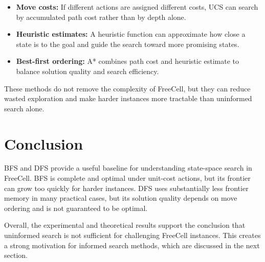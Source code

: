 \documentclass{article}
\begin{document}
\begin{itemize}
\item \textbf{Move costs:} If different actions are assigned different costs, UCS can search by accumulated path cost rather than by depth alone.
\item \textbf{Heuristic estimates:} A heuristic function can approximate how close a state is to the goal and guide the search toward more promising states.
\item \textbf{Best-first ordering:} A* combines path cost and heuristic estimate to balance solution quality and search efficiency.
\end{itemize}

These methods do not remove the complexity of FreeCell, but they can reduce wasted exploration and make harder instances more tractable than uninformed search alone.

\section{Conclusion}

BFS and DFS provide a useful baseline for understanding state-space search in FreeCell. BFS is complete and optimal under unit-cost actions, but its frontier can grow too quickly for harder instances. DFS uses substantially less frontier memory in many practical cases, but its solution quality depends on move ordering and is not guaranteed to be optimal.

Overall, the experimental and theoretical results support the conclusion that uninformed search is not sufficient for challenging FreeCell instances. This creates a strong motivation for informed search methods, which are discussed in the next section.
\end{document}
